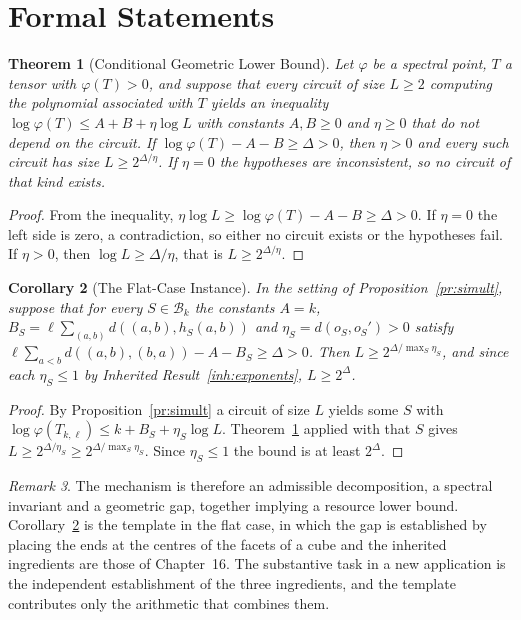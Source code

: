 \documentclass[11pt,letterpaper]{report}
\theoremstyle{plain}
\newtheorem{theorem}{Theorem}[chapter]
\newtheorem{corollary}[theorem]{Corollary}
\theoremstyle{definition}
\theoremstyle{remark}
\newtheorem{remark}[theorem]{Remark}
\begin{document}
\section{Formal Statements}

\begin{theorem}[Conditional Geometric Lower Bound]\label{th:syntheticgeom}
Let $\varphi$ be a spectral point, $T$ a tensor with $\varphi(T)>0$, and suppose that every circuit of size $L\ge2$ computing the polynomial associated with $T$ yields an inequality $\log\varphi(T)\le A+B+\eta\log L$ with constants $A,B\ge0$ and $\eta\ge0$ that do not depend on the circuit. If $\log\varphi(T)-A-B\ge\Delta>0$, then $\eta>0$ and every such circuit has size $L\ge2^{\Delta/\eta}$. If $\eta=0$ the hypotheses are inconsistent, so no circuit of that kind exists.
\end{theorem}
\begin{proof}
From the inequality, $\eta\log L\ge\log\varphi(T)-A-B\ge\Delta>0$. If $\eta=0$ the left side is zero, a contradiction, so either no circuit exists or the hypotheses fail. If $\eta>0$, then $\log L\ge\Delta/\eta$, that is $L\ge2^{\Delta/\eta}$.
\end{proof}

\begin{corollary}[The Flat-Case Instance]\label{co:flatinstance}
In the setting of Proposition~\ref{pr:simult}, suppose that for every $S\in\mathcal B_k$ the constants $A=k$, $B_S=\ell\sum_{(a,b)}d((a,b),h_S(a,b))$ and $\eta_S=d(o_S,o_S')>0$ satisfy $\ell\sum_{a<b}d((a,b),(b,a))-A-B_S\ge\Delta>0$. Then $L\ge2^{\Delta/\max_S\eta_S}$, and since each $\eta_S\le1$ by Inherited Result~\ref{inh:exponents}, $L\ge2^{\Delta}$.
\end{corollary}
\begin{proof}
By Proposition~\ref{pr:simult} a circuit of size $L$ yields some $S$ with $\log\varphi(T_{k,\ell})\le k+B_S+\eta_S\log L$. Theorem~\ref{th:syntheticgeom} applied with that $S$ gives $L\ge2^{\Delta/\eta_S}\ge2^{\Delta/\max_S\eta_S}$. Since $\eta_S\le1$ the bound is at least $2^\Delta$.
\end{proof}

\begin{remark}
The mechanism is therefore an admissible decomposition, a spectral invariant and a geometric gap, together implying a resource lower bound. Corollary~\ref{co:flatinstance} is the template in the flat case, in which the gap is established by placing the ends at the centres of the facets of a cube and the inherited ingredients are those of Chapter~16. The substantive task in a new application is the independent establishment of the three ingredients, and the template contributes only the arithmetic that combines them.
\end{remark}
\end{document}

